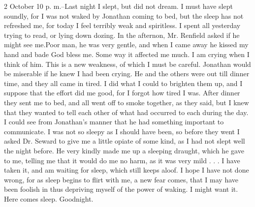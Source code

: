 2 October 10 p. m.--Last night I slept, but did not dream. I must have slept soundly, for I was not waked by Jonathan coming to bed, but the sleep has not refreshed me, for today I feel terribly weak and spiritless. I spent all yesterday trying to read, or lying down dozing. In the afternon, Mr. Renfield asked if he might see me.Poor man, he was very gentle, and when I came away he kissed my hand and bade God bless me. Some way it affected me much. I am crying when I think of him. This is a new weakness, of which I must be careful. Jonathan would be miserable if he knew I had been crying. He and the others were out till dinner time, and they all came in tired. I did what I could to brighten them up, and I suppose that the effort did me good, for I forgot how tired I was. After dinner they sent me to bed, and all went off to smoke together, as they said, but I knew that they wanted to tell each other of what had occurred to each during the day. I could see from Jonathan's manner that he had something important to communicate. I was not so sleepy as I should have been, so before they went I asked Dr. Seward to give me a little opiate of some kind, as I had not slept well the night before. He very kindly made me up a sleeping draught, which he gave to me, telling me that it would do me no harm, as it was very mild . . . I have taken it, and am waiting for sleep, which still keeps aloof. I hope I have not done wrong, for as sleep begins to flirt with me, a new fear comes, that I may have been foolish in thus depriving myself of the power of waking. I might want it. Here comes sleep. Goodnight. 
